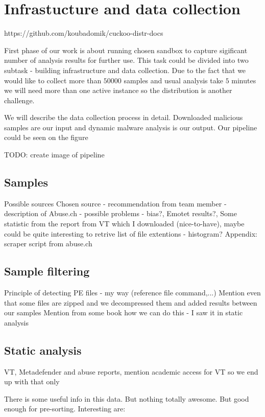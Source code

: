 \chapter{Infrastucture and data collection} \label{chap:infrastructure}

https://github.com/koubadomik/cuckoo-distr-docs

First phase of our work is about running chosen sandbox to capture sigificant number of analysis results for further use. This task could be divided into two subtask - building infrastructure and data collection. Due to the fact that we would like to collect more than $50 000$ samples and usual analysis take $5$ minutes we will need more than one active instance so the distribution is another challenge.

We will describe the data collection process in detail. Downloaded malicious samples are our input and dynamic malware analysis is our output. Our pipeline could be seen on the figure 



TODO: create image of pipeline 

\section{Samples}
Possible sources
Chosen source
- recommendation from team member
- description of Abuse.ch
- possible problems - bias?, Emotet results?, Some statistic from the report from VT which I downloaded (nice-to-have), maybe could be quite interesting to retrive list of file extentions - histogram?
Appendix: scraper script from abuse.ch
\section{Sample filtering}
Principle of detecting PE files - my way (reference file command,...)
Mention even that some files are zipped and we decompressed them and added results between our samples
Mention from some book how we can do this - I saw it in static analysis

\section{Static analysis}
VT, Metadefender and abuse reports, mention academic access for VT so we end up with that only

There is some useful info in this data. But nothing totally awesome. But good enough for pre-sorting.
Interesting are:

